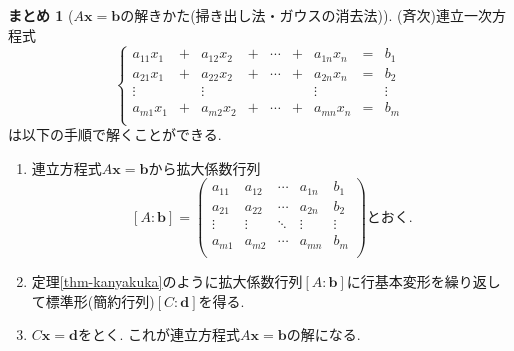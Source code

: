 \documentclass[dvipdfmx,a4paper,11pt]{article}
\theoremstyle{definition}
\newtheorem{suma}[thm]{まとめ}
\begin{document}
\begin{tcolorbox}[
    colback = white,
    colframe = green!35!black,
    fonttitle = \bfseries,
    breakable = true]
        \begin{suma}[$A\bm{x} =\bm{b}$の解きかた(掃き出し法・ガウスの消去法)]
\label{suma-gauss}
(斉次)連立一次方程式
\begin{equation*}
\left\{ 
\begin{matrix}
a_{11}x_1&+& a_{12} x_2& +&\cdots &+&a_{1n}x_n &= &b_1\\
a_{21}x_1&+& a_{22} x_2& +&\cdots &+&a_{2n}x_n &= &b_2 \\
\vdots		&& 	\vdots				 && 		& &\vdots&&\vdots	\\
a_{m1}x_1&+& a_{m2} x_2& +&\cdots &+&a_{mn}x_n &= &b_m \\
\end{matrix}
\right.
\end{equation*}
は以下の手順で解くことができる. 
     \begin{enumerate}
    \setlength{\parskip}{0cm} 
  \setlength{\itemsep}{0cm}
 \item  連立方程式$A\bm{x} =\bm{b}$から拡大係数行列
 $$
 [A:\bm{b}]=\begin{pmatrix}
a_{11}& a_{12} & \cdots &a_{1n} &b_1\\
a_{21}& a_{22} & \cdots &a_{2n} &b_2\\
\vdots& \vdots	&	\ddots   &	\vdots &\vdots\\
a_{m1}& a_{m2} & \cdots &a_{mn} &b_m\\
\end{pmatrix}
\text{とおく.}
 $$
 \item 定理\ref{thm-kanyakuka}のように拡大係数行列$[A:\bm{b}]$に行基本変形を繰り返して標準形(簡約行列)$[C:\bm{d}]$を得る.
 \item $C \bm{x}=\bm{d}$をとく. これが連立方程式$A\bm{x} =\bm{b}$の解になる. 
 \end{enumerate}
\end{suma}
 \end{tcolorbox}
 
\end{document}
